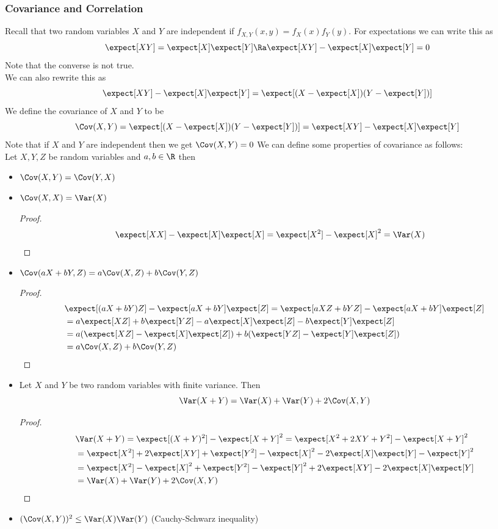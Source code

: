 \subsubsection{Covariance and Correlation}
Recall that two random variables $X$ and $Y$ are independent if $f_{X,Y}(x,y)=f_X(x)f_Y(y)$. For expectations we can write this as
\[\expect[XY]=\expect[X]\expect[Y]\Ra \expect[XY]-\expect[X]\expect[Y]=0\]
Note that the converse is not true.\\
We can also rewrite this as
\[\expect[XY]-\expect[X]\expect[Y]=\expect[(X-\expect[X])(Y-\expect[Y])]\]
We define the covariance of $X$ and $Y$ to be
$$\Cov(X,Y)=\expect[(X-\expect[X])(Y-\expect[Y])]=\expect[XY]-\expect[X]\expect[Y]$$
Note that if $X$ and $Y$ are independent then we get $\Cov(X,Y)=0$
We can define some properties of covariance as follows:\\
Let $X,Y,Z$ be random variables and $a,b\in\R$ then
\begin{itemize}
    \item $\Cov(X,Y)=\Cov(Y,X)$
    \item $\Cov(X,X)=\Var(X)$
    \begin{proof}
        \begin{align*}
            &\expect[XX]-\expect[X]\expect[X]=\expect[X^2]-\expect[X]^2=\Var(X)
        \end{align*}
    \end{proof}
    \item $\Cov(aX+bY,Z)=a\Cov(X,Z)+b\Cov(Y,Z)$
    \begin{proof}
        \begin{align*}
            &\expect[(aX+bY)Z]-\expect[aX+bY]\expect[Z]=\expect[aXZ+bYZ]-\expect[aX+bY]\expect[Z]\\
            &=a\expect[XZ]+b\expect[YZ]-a\expect[X]\expect[Z]-b\expect[Y]\expect[Z]\\
            &=a(\expect[XZ]-\expect[X]\expect[Z])+b(\expect[YZ]-\expect[Y]\expect[Z])\\
            &=a\Cov(X,Z)+b\Cov(Y,Z)
        \end{align*}
    \end{proof}
    \item Let $X$ and $Y$ be two random variables with finite variance. Then
    \[\Var(X+Y)=\Var(X)+\Var(Y)+2\Cov(X,Y)\]
    \begin{proof}
        \begin{align*}
            &\Var(X+Y)=\expect[(X+Y)^2]-\expect[X+Y]^2=\expect[X^2+2XY+Y^2]-\expect[X+Y]^2\\
            &=\expect[X^2]+2\expect[XY]+\expect[Y^2]-\expect[X]^2-2\expect[X]\expect[Y]-\expect[Y]^2\\
            &=\expect[X^2]-\expect[X]^2+\expect[Y^2]-\expect[Y]^2+2\expect[XY]-2\expect[X]\expect[Y]\\
            &=\Var(X)+\Var(Y)+2\Cov(X,Y)
        \end{align*}
    \end{proof}
    \item $(\Cov(X,Y))^2\leq\Var(X)\Var(Y)$ (Cauchy-Schwarz inequality)
\end{itemize}
